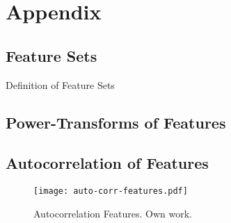 \section{Appendix}


\subsection{Feature Sets}
\label{app:feature-sets}

\begin{table}[H]
    \centering
    
    \caption[Overview of Feature Sets]{Definition of Feature Sets}
    \label{tab:feature-set-definition}
\end{table}

\newpage

\newpage
\subsection{Power-Transforms of Features}
\label{app:power-transforms-of-features}

\newpage
\subsection{Autocorrelation of Features}
\label{app:autocorrelation-of-features}

\begin{figure}[ht]
    \centering
    \texttt{[image: auto-corr-features.pdf]}
    \caption[Autocorrelation of Features]{Autocorrelation Features. Own work.}
    \label{fig:auto-correlation-features}
\end{figure}
